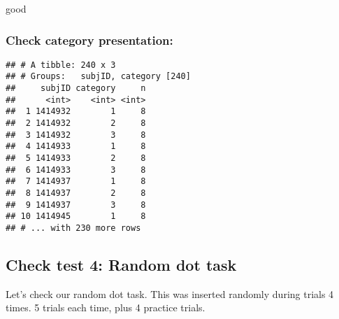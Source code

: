 \documentclass[
]{article}
\newenvironment{Shaded}{\begin{snugshade}}{\end{snugshade}}
\newcommand{\DataTypeTok}[1]{\textcolor[rgb]{0.13,0.29,0.53}{#1}}
\newcommand{\KeywordTok}[1]{\textcolor[rgb]{0.13,0.29,0.53}{\textbf{#1}}}
\newcommand{\NormalTok}[1]{#1}
\newcommand{\OperatorTok}[1]{\textcolor[rgb]{0.81,0.36,0.00}{\textbf{#1}}}
\newcommand{\OtherTok}[1]{\textcolor[rgb]{0.56,0.35,0.01}{#1}}
\newcommand{\StringTok}[1]{\textcolor[rgb]{0.31,0.60,0.02}{#1}}
\begin{document}
good

\begin{Shaded}
\end{Shaded}

\hypertarget{check-category-presentation}{%
\subsubsection{Check category
presentation:}\label{check-category-presentation}}

\begin{Shaded}
\end{Shaded}

\begin{verbatim}
## # A tibble: 240 x 3
## # Groups:   subjID, category [240]
##     subjID category     n
##      <int>    <int> <int>
##  1 1414932        1     8
##  2 1414932        2     8
##  3 1414932        3     8
##  4 1414933        1     8
##  5 1414933        2     8
##  6 1414933        3     8
##  7 1414937        1     8
##  8 1414937        2     8
##  9 1414937        3     8
## 10 1414945        1     8
## # ... with 230 more rows
\end{verbatim}

\hypertarget{check-test-4-random-dot-task}{%
\subsection{Check test 4: Random dot
task}\label{check-test-4-random-dot-task}}

Let's check our random dot task. This was inserted randomly during
trials 4 times. 5 trials each time, plus 4 practice trials.
\end{document}
